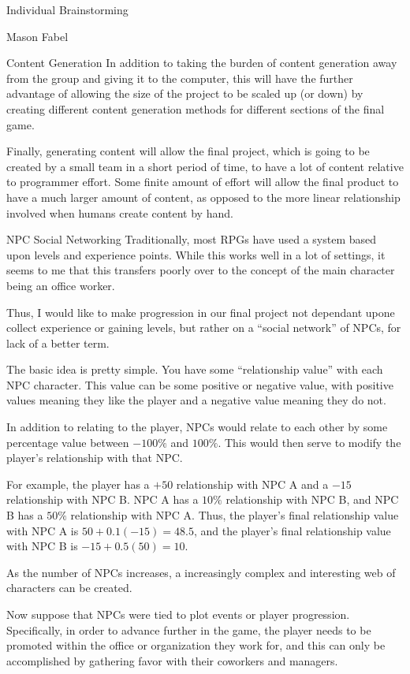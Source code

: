 \documentclass[12pt]{report}
\begin{document}
\begin{section}{Individual Brainstorming}
\begin{subsection}{Mason Fabel}
\begin{subsubsection}{Content Generation}
In addition to taking the burden of content generation away from the group
and giving it to the computer, this will have the further advantage of
allowing the size of the project to be scaled up (or down) by creating
different content generation methods for different sections of the final
game.

Finally, generating content will allow the final project, which is going to
be created by a small team in a short period of time, to have a lot of
content relative to programmer effort. Some finite amount of effort will
allow the final product to have a much larger amount of content, as
opposed to the more linear relationship involved when humans create
content by hand.
\end{subsubsection}

\begin{subsubsection}{NPC Social Networking}
Traditionally, most RPGs have used a system based upon levels and
experience points. While this works well in a lot of settings, it seems to
me that this transfers poorly over to the concept of the main character
being an office worker.

Thus, I would like to make progression in our final project not dependant
upone collect experience or gaining levels, but rather on a ``social
network'' of NPCs, for lack of a better term.

The basic idea is pretty simple. You have some ``relationship value''
with each NPC character. This value can be some positive or negative value,
with positive values meaning they like the player and a negative value
meaning they do not.

In addition to relating to the player, NPCs would relate to each other by
some percentage value between $-100\%$ and $100\%$. This would then serve
to modify the player's relationship with that NPC.

For example, the player has a $+50$ relationship with NPC A and a $-15$
relationship with NPC B. NPC A has a $10\%$ relationship with NPC B, and
NPC B has a $50\%$ relationship with NPC A. Thus, the player's final
relationship value with NPC A is $50+0.1(-15)=48.5$, and the player's
final relationship value with NPC B is $-15+0.5(50)=10$.

As the number of NPCs increases, a increasingly complex and interesting web
of characters can be created.

Now suppose that NPCs were tied to plot events or player progression.
Specifically, in order to advance further in the game, the player needs
to be promoted within the office or organization they work for, and this
can only be accomplished by gathering favor with their coworkers and
managers.


\end{subsubsection}
\end{subsection}
\end{section}
\end{document}
